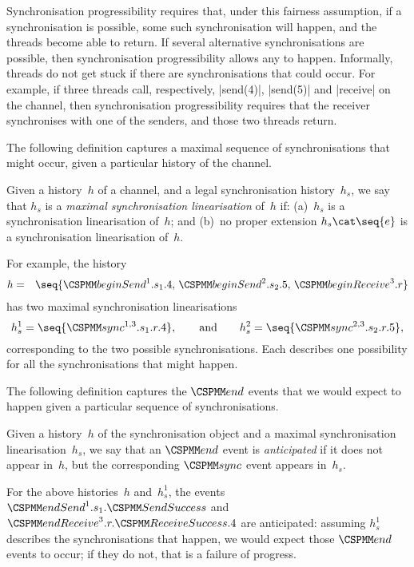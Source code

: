 
Synchronisation progressibility requires that, under this fairness assumption,
if a synchronisation is possible, some such synchronisation will happen, and
the threads become able to return.  If several alternative synchronisations
are possible, then synchronisation progressibility allows any to happen.
Informally, threads do not get stuck if there are synchronisations that could
occur.  For example, if three threads call, respectively, |send(4)|, |send(5)|
and |receive| on the channel, then synchronisation progressibility requires
that the receiver synchronises with one of the senders, and those two threads
return.


The following definition captures a maximal sequence of synchronisations that
might occur, given a particular history of the channel.
%
\begin{definition}
Given a history~$h$ of a channel, and a legal synchronisation history~$h_s$,
we say that $h_s$ is a \emph{maximal synchronisation linearisation} of~$h$ if:
(a)~$h_s$ is a synchronisation linearisation of~$h$; and (b)~no proper
extension $h_s \cat \seq{e}$ is a synchronisation linearisation of~$h$.
\end{definition}
%
For example, the history 
\begin{eqnarray*}
h & = &\seq{\beginSend^1.s_1.4,\, \beginSend^2.s_2.5,\, \beginReceive^3.r }
\end{eqnarray*}
has two maximal synchronisation linearisations
\[
h_s^1  =   \seq{\sync^{1,3}.s_1.r.4}, \qquad\mbox{and}\qquad
h_s^2  =  \seq{\sync^{2,3}.s_2.r.5},
\]
corresponding to the two possible synchronisations.  Each describes one
possibility for all the synchronisations that might happen. 


The following definition captures the $\End$ events that we would expect to
happen given a particular sequence of synchronisations.
%
\begin{definition}
Given a history~$h$ of the synchronisation object and a maximal
synchronisation linearisation~$h_s$, we say that an $\End$ event is
\emph{anticipated} if it does not appear in~$h$, but the corresponding $\sync$
event appears in~$h_s$.
\end{definition}
%
For the above histories~$h$ and~$h_s^1$, the events
$\endSend^1.s_1.\SendSuccess$ and $\endReceive^3.r.\ReceiveSuccess.4$  are
anticipated: assuming $h_s^1$ describes the synchronisations that happen, we
would expect those $\End$ events to occur; if they do not, that is a failure
of progress.

